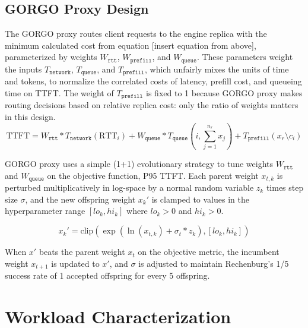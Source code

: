 \documentclass{article}
\begin{document}
\bigskip
\subsection{GORGO Proxy Design}

The GORGO proxy routes client requests to the engine replica with the minimum calculated cost from equation [insert equation from above], parameterized by weights $W_{\texttt{rtt}}$, $W_{\texttt{prefill}}$, and $W_{\texttt{queue}}$. These parameters weight the inputs $T_{\texttt{network}}$, $T_{\texttt{queue}}$, and $T_{\texttt{prefill}}$, which unfairly mixes the units of time and tokens, to normalize the correlated costs of latency, prefill cost, and queueing time on TTFT. The weight of $T_{\texttt{prefill}}$ is fixed to 1 because GORGO proxy makes routing decisions based on relative replica cost: only the ratio of weights matters in this design.
\begin{equation}
\mathrm{TTFT} = W_{\texttt{rtt}} * T_{\texttt{network}}(\mathrm{RTT}_i) + W_{\texttt{queue}} * T_{\texttt{queue}}\left(i, \sum_{j=1}^{n_r} x_j\right) + T_{\texttt{prefill}}(x_r \setminus c_i)
\label{eq:score}
\end{equation}

GORGO proxy uses a simple (1+1) evolutionary strategy to tune weights $W_{\texttt{rtt}}$ and $W_{\texttt{queue}}$ on the objective function, P95 TTFT.
Each parent weight $x_{t,k}$ is perturbed multiplicatively in log-space by a normal random variable $z_k$ times step size $\sigma$, and the new offspring weight $x_k'$ is clamped to values in the hyperparameter range $[lo_k, hi_k]$ where $lo_k > 0$ and $hi_k > 0$.

\begin{equation}
x_k' = \mathrm{clip}\left(\exp(\ln(x_{t,k}) + \sigma_t * z_k), [lo_k, hi_k]\right)
\end{equation}

When $x'$ beats the parent weight $x_t$ on the objective metric, the incumbent weight $x_{t+1}$ is updated to $x'$, and $\sigma$ is adjusted to maintain Rechenburg's 1/5 success rate of 1 accepted offspring for every 5 offspring.

\section{Workload Characterization}
\label{sec:characterization}
\end{document}
